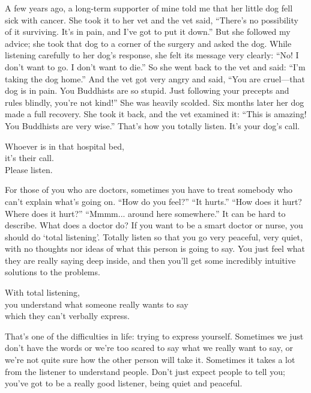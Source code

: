 \documentclass[12pt, openany]{book}
\newenvironment{aphorism}%
{%
\begin{center}\begin{itshape}
}%
{\end{itshape}\end{center}
}%
\begin{document}
A few years ago, a long-term supporter of mine told me that her little dog fell sick with cancer. She took it to her vet and the vet said, “There’s no possibility of it surviving. It’s in pain, and I’ve got to put it down.” But she followed my advice; she took that dog to a corner of the surgery and asked the dog. While listening carefully to her dog’s response, she felt its message very clearly: “No! I don’t want to go. I don’t want to die.” So she went back to the vet and said: “I’m taking the dog home.” And the vet got very angry and said, “You are cruel—that dog is in pain. You Buddhists are so stupid. Just following your precepts and rules blindly, you’re not kind!” She was heavily scolded. Six months later her dog made a full recovery. She took it back, and the vet examined it: “This is amazing! You Buddhists are very wise.” That’s how you totally listen. It’s your dog’s call. 

\begin{aphorism}
Whoever is in that hospital bed,\\  
it’s their call.\\ 
Please listen.
\end{aphorism}

For those of you who are doctors, sometimes you have to treat somebody who can’t explain what’s going on. “How do you feel?” “It hurts.” “How does it hurt? Where does it hurt?” “Mmmm... around here somewhere.” It can be hard to describe. What does a doctor do? If you want to be a smart doctor or nurse, you should do ‘total listening’. Totally listen so that you go very peaceful, very quiet, with no thoughts nor ideas of what this person is going to say. You just feel what they are really saying deep inside, and then you’ll get some incredibly intuitive solutions to the problems. 

\begin{aphorism}
With total listening,\\  
you understand what someone really wants to say \\
which they can’t verbally express.
\end{aphorism}

That’s one of the difficulties in life: trying to express yourself. Sometimes we just don’t have the words or we’re too scared to say what we really want to say, or we’re not quite sure how the other person will take it. Sometimes it takes a lot from the listener to understand people. Don’t just expect people to tell you; you’ve got to be a really good listener, being quiet and peaceful. 
\end{document}
